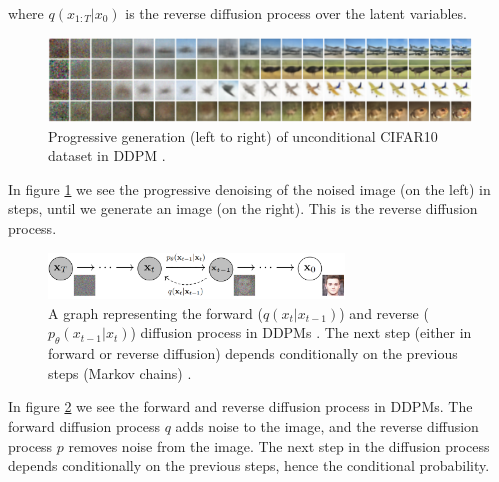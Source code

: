 where $q(x_{1:T} | x_0)$ is the reverse diffusion process over the latent variables.


\begin{figure}
    \centering
    \includegraphics[width=1\textwidth]{images/diffusion_models/ddpm_denoise.png}
    \caption{Progressive generation (left to right) of unconditional CIFAR10 dataset in DDPM \cite{ddpm}.}
    \label{fig:ddpm_progressive_generation}
\end{figure}

In figure \ref{fig:ddpm_progressive_generation} we see the progressive denoising of the noised image (on the left) in steps, until we generate an image (on the right). This is the reverse diffusion process.

\begin{figure}
    \centering
    \includegraphics[width=0.7\textwidth]{images/diffusion_models/ddpm_process.png}
    \caption{A graph representing the forward ($q(x_t | x_{t-1})$) and reverse ($p_\theta(x_{t-1} | x_t)$) diffusion process in DDPMs \cite{ddpm}. The next step (either in forward or reverse diffusion) depends conditionally on the previous steps (Markov chains) \cite{ddpm}.}
    \label{fig:ddpm_process}
\end{figure}

In figure \ref{fig:ddpm_process} we see the forward and reverse diffusion process in DDPMs. The forward diffusion process $q$ adds noise to the image, and the reverse diffusion process $p$ removes noise from the image. The next step in the diffusion process depends conditionally on the previous steps, hence the conditional probability.





